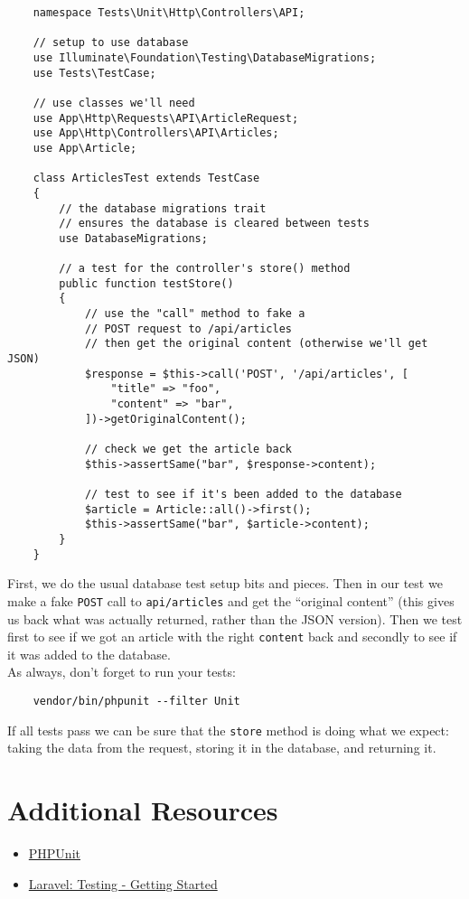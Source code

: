 \begin{verbatim}
    namespace Tests\Unit\Http\Controllers\API;

    // setup to use database
    use Illuminate\Foundation\Testing\DatabaseMigrations;
    use Tests\TestCase;

    // use classes we'll need
    use App\Http\Requests\API\ArticleRequest;
    use App\Http\Controllers\API\Articles;
    use App\Article;

    class ArticlesTest extends TestCase
    {
        // the database migrations trait
        // ensures the database is cleared between tests
        use DatabaseMigrations;

        // a test for the controller's store() method
        public function testStore()
        {
            // use the "call" method to fake a
            // POST request to /api/articles
            // then get the original content (otherwise we'll get JSON)
            $response = $this->call('POST', '/api/articles', [
                "title" => "foo",
                "content" => "bar",
            ])->getOriginalContent();

            // check we get the article back
            $this->assertSame("bar", $response->content);

            // test to see if it's been added to the database
            $article = Article::all()->first();
            $this->assertSame("bar", $article->content);
        }
    }
\end{verbatim}

First, we do the usual database test setup bits and pieces. Then in our test we make a fake \texttt{POST} call to \texttt{api/articles} and get the ``original content'' (this gives us back what was actually returned, rather than the JSON version). Then we test first to see if we got an article with the right \texttt{content} back and secondly to see if it was added to the database.
\\

As always, don't forget to run your tests:

\begin{verbatim}
    vendor/bin/phpunit --filter Unit
\end{verbatim}

If all tests pass we can be sure that the \texttt{store} method is doing what we expect: taking the data from the request, storing it in the database, and returning it.



\section{Additional Resources}

\begin{itemize}[leftmargin=*]
    \item \href{https://github.com/sebastianbergmann/phpunit}{PHPUnit}
    \item \href{http://laravel.com/docs/6.x/testing}{Laravel: Testing - Getting Started}
\end{itemize}
